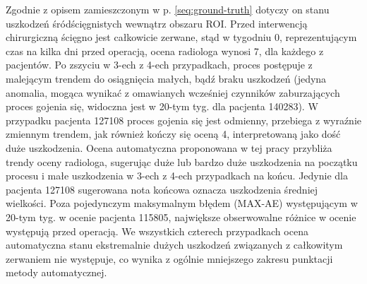 Zgodnie z opisem zamieszczonym w p. \ref{seq:ground-truth} dotyczy on stanu uszkodzeń śródścięgnistych wewnątrz obszaru ROI. Przed interwencją chirurgiczną ścięgno jest całkowicie zerwane, stąd w tygodniu 0, reprezentującym czas na kilka dni przed operacją, ocena radiologa wynosi 7, dla każdego z pacjentów. Po zszyciu w 3-ech z 4-ech przypadkach, proces postępuje z malejącym trendem do osiągnięcia małych, bądź braku uszkodzeń (jedyna anomalia, mogąca wynikać z omawianych wcześniej czynników zaburzających proces gojenia się, widoczna jest w 20-tym tyg. dla pacjenta 140283). W przypadku pacjenta 127108 proces gojenia się jest odmienny, przebiega z wyraźnie zmiennym trendem, jak również kończy się oceną 4, interpretowaną jako dość duże uszkodzenia. Ocena automatyczna proponowana w tej pracy przybliża trendy oceny radiologa, sugerując duże lub bardzo duże uszkodzenia na początku procesu i małe uszkodzenia w 3-ech z 4-ech przypadkach na końcu. Jedynie dla pacjenta 127108 sugerowana nota końcowa oznacza uszkodzenia średniej wielkości. Poza pojedynczym maksymalnym błędem (MAX-AE) występującym w 20-tym tyg. w ocenie pacjenta 115805, największe obserwowalne różnice w ocenie występują przed operacją. \linebreak We wszystkich czterech przypadkach ocena automatyczna stanu ekstremalnie dużych uszkodzeń związanych z całkowitym zerwaniem nie występuje, co wynika z ogólnie mniejszego zakresu punktacji metody automatycznej. 

